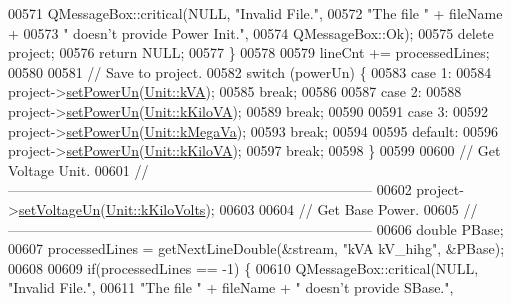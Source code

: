 \begin{DoxyCode}
00571     QMessageBox::critical(NULL, \textcolor{stringliteral}{"Invalid File."},
00572                           \textcolor{stringliteral}{"The file "} + fileName +
00573                           \textcolor{stringliteral}{" doesn't provide Power Init."},
00574                           QMessageBox::Ok);
00575     \textcolor{keyword}{delete} project;
00576     \textcolor{keywordflow}{return} NULL;
00577   \}
00578 
00579   lineCnt += processedLines;
00580 
00581 \textcolor{comment}{// Save to project.}
00582   \textcolor{keywordflow}{switch} (powerUn) \{
00583   \textcolor{keywordflow}{case} 1:
00584     project->\hyperlink{class_project_aa46b8645d2047c1a2e8d329b9ebbc120}{setPowerUn}(\hyperlink{class_unit_ace265ae255370ccacfd5370337572c3ba72b181a842ae2759488a2fa1410d3696}{Unit::kVA});
00585     \textcolor{keywordflow}{break};
00586 
00587   \textcolor{keywordflow}{case} 2:
00588     project->\hyperlink{class_project_aa46b8645d2047c1a2e8d329b9ebbc120}{setPowerUn}(\hyperlink{class_unit_ace265ae255370ccacfd5370337572c3bac9e5154522fbb810d7aed75c3ff47cb2}{Unit::kKiloVA});
00589     \textcolor{keywordflow}{break};
00590 
00591   \textcolor{keywordflow}{case} 3:
00592     project->\hyperlink{class_project_aa46b8645d2047c1a2e8d329b9ebbc120}{setPowerUn}(\hyperlink{class_unit_ace265ae255370ccacfd5370337572c3ba6039da0ed20f8bee64305bab8bdec365}{Unit::kMegaVa});
00593     \textcolor{keywordflow}{break};
00594 
00595   \textcolor{keywordflow}{default}:
00596     project->\hyperlink{class_project_aa46b8645d2047c1a2e8d329b9ebbc120}{setPowerUn}(\hyperlink{class_unit_ace265ae255370ccacfd5370337572c3bac9e5154522fbb810d7aed75c3ff47cb2}{Unit::kKiloVA});
00597     \textcolor{keywordflow}{break};
00598   \}
00599 
00600 \textcolor{comment}{// Get Voltage Unit.}
00601 \textcolor{comment}{//------------------------------------------------------------------------------}
00602   project->\hyperlink{class_project_aa26b488b2e93c8a8c6b4423ce07df4a1}{setVoltageUn}(\hyperlink{class_unit_a55b07dfa9457e1eca2c7194fe0cfc3c1a35a201a658c2cd89766787c657e9a54d}{Unit::kKiloVolts});
00603 
00604 \textcolor{comment}{// Get Base Power.}
00605 \textcolor{comment}{//------------------------------------------------------------------------------}
00606   \textcolor{keywordtype}{double} PBase;
00607   processedLines = getNextLineDouble(&stream, \textcolor{stringliteral}{"kVA    kV\_hihg"}, &PBase);
00608 
00609   \textcolor{keywordflow}{if}(processedLines == -1) \{
00610     QMessageBox::critical(NULL, \textcolor{stringliteral}{"Invalid File."},
00611                           \textcolor{stringliteral}{"The file "} + fileName + \textcolor{stringliteral}{" doesn't provide SBase."},

\end{DoxyCode}
